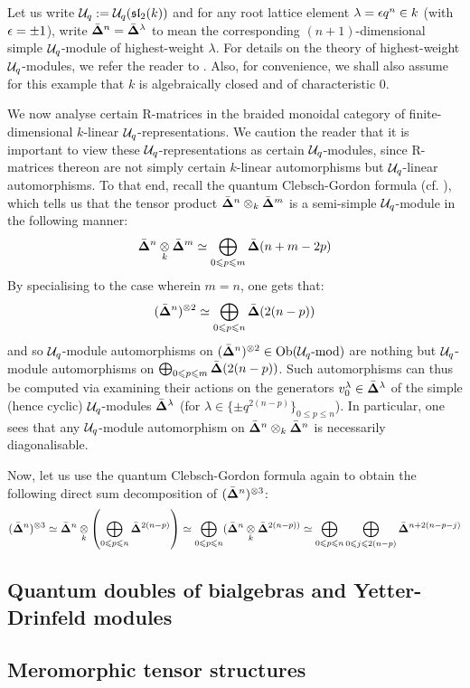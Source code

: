         \begin{example}
            Let us write $\mathcal{U}_q := \mathcal{U}_q(\mathfrak{sl}_2(k))$ and for any root lattice element $\lambda = \epsilon q^n\in k$ (with $\epsilon = \pm 1$), write $\bar{ \mathbf{ \Delta } }^n = \bar{ \mathbf{ \Delta } }^{\lambda}$ to mean the corresponding $(n + 1)$-dimensional simple $\mathcal{U}_q$-module of highest-weight $\lambda$. For details on the theory of highest-weight $\mathcal{U}_q$-modules, we refer the reader to \cite[Chapters VI and VII]{kassel_quantum_groups}. Also, for convenience, we shall also assume for this example that $k$ is algebraically closed and of characteristic $0$. 
            
            We now analyse certain R-matrices in the braided monoidal category of finite-dimensional $k$-linear $\mathcal{U}_q$-representations. We caution the reader that it is important to view these $\mathcal{U}_q$-representations as certain $\mathcal{U}_q$-modules, since R-matrices thereon are not simply certain $k$-linear automorphisms but $\mathcal{U}_q$-linear automorphisms. To that end, recall the quantum Clebsch-Gordon formula (cf. \cite[Theorem VII.7.1]{kassel_quantum_groups}), which tells us that the tensor product $\qsimple^n \tensor_k \qsimple^m$ is a semi-simple $\mathcal{U}_q$-module in the following manner:
                $$\qsimple^n \tensor_k \qsimple^m \cong \bigoplus_{0 \leq p \leq m} \qsimple(n + m - 2p)$$
            By specialising to the case wherein $m = n$, one gets that:
                $$(\qsimple^n)^{\tensor 2} \cong \bigoplus_{0 \leq p \leq n} \qsimple(2(n - p))$$
            and so $\mathcal{U}_q$-module automorphisms on $(\qsimple^n)^{\tensor 2} \in \Ob(\calU_q\mod)$ are nothing but $\mathcal{U}_q$-module automorphisms on $\bigoplus_{0 \leqslant p \leqslant m} \bar{ \mathbf{ \Delta } }(2(n - p))$. Such automorphisms can thus be computed via examining their actions on the generators $v^{\lambda}_0 \in \bar{ \mathbf{ \Delta } }^{\lambda}$ of the simple (hence cyclic) $\mathcal{U}_q$-modules $\bar{ \mathbf{ \Delta } }^{\lambda}$ (for $\lambda \in \{\pm q^{ 2(n - p) }\}_{0 \leq p \leq n}$). In particular, one sees that any $\mathcal{U}_q$-module automorphism on $\qsimple^n \tensor_k \qsimple^n$ is necessarily diagonalisable. 
            
            Now, let us use the quantum Clebsch-Gordon formula again to obtain the following direct sum decomposition of $(\qsimple^n)^{\tensor 3}$:
                $$(\qsimple^n)^{\tensor 3} \cong \qsimple^n \tensor_k \left( \bigoplus_{0 \leq p \leq n} \qsimple^{2(n - p)} \right) \cong \bigoplus_{0 \leq p \leq n} ( \qsimple^n \tensor_k \qsimple^{2(n - p))} \cong \bigoplus_{0 \leq p \leq n} \bigoplus_{0 \leq j \leq 2(n - p)} \qsimple^{n + 2(n - p - j)}$$
        \end{example}
    
    \subsection{Quantum doubles of bialgebras and Yetter-Drinfeld modules}

    \subsection{Meromorphic tensor structures}
